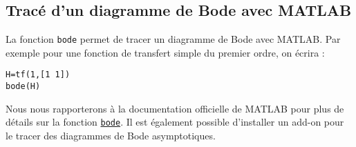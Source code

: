 \subsection{Tracé d'un diagramme de Bode avec MATLAB}
La fonction \texttt{bode} permet de tracer un diagramme de Bode avec MATLAB.
Par exemple pour une fonction de transfert simple du premier ordre, on écrira :
\begin{verbatim}
H=tf(1,[1 1]) 
bode(H)
\end{verbatim}
Nous nous rapporterons à la documentation officielle de MATLAB pour
plus de détails sur la fonction 
\href{https://fr.mathworks.com/help/control/ref/dynamicsystem.bode.html}{\texttt{bode}}.
Il est également possible d'installer un add-on pour le tracer des diagrammes 
de Bode asymptotiques.
